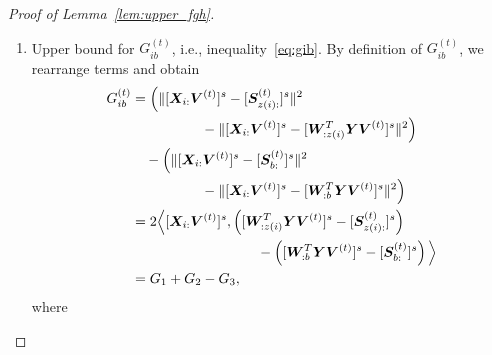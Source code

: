 \documentclass[journal]{IEEEtran}
\theoremstyle{definition}
\theoremstyle{definition}
\newcommand{\of}[1]{\left(#1\right)}
\begin{document}
\begin{proof}[Proof of Lemma~\ref{lem:upper_fgh}]
\begin{enumerate}[wide]
    \vspace{-0.5cm}
    \small
    \begin{align}
        &\onormSize{}{  [  \tilde \mS_{z(i):} ]^s - [  \tilde \mS_{b:} ]^s  }^2 \\
        &=  \onormSize{}{  [  \tilde \mS_{z(i):} ]^s -[ \mS_{z(i):} ]^s +  [ \mS_{z(i):} ]^s - [ \mS_{b:} ]^s + [ \mS_{b:} ]^s -[  \tilde \mS_{b:} ]^s  }^2 \\
        & \lesssim \onormSize{}{ [ \mS_{z(i):} ]^s - [ \mS_{b:} ]^s }^2 + \max_{a \in [r]} \onormSize{}{ [ \mS_{a:} ]^s -[  \tilde \mS_{a:} ]^s }^2 \\
        & \lesssim \onormSize{}{ [ \mS_{z(i):} ]^s - [ \mS_{b:} ]^s }^2  + \max_{a \in [r]} \frac{1}{\onormSize{}{\mS_{a:} }^2} \onormSize{}{ \mW_{:a}^T \mE \mV}^2\\
        & \lesssim \onormSize{}{ [ \mS_{z(i):} ]^s - [ \mS_{b:} ]^s }^2, \label{eq:fib_2}
    \end{align}
    \normalsize
    where the second inequality follows from Lemma~\ref{lem:norm_diff}, and the last inequality follows from the assumptions on $\onormSize{}{\mS_{a:}}$ in the parameter space~\eqref{eq:family}, the inequality~\eqref{eq:cond1} in Condition~\ref{cond:origin} and the assumption $\Delta_{\min}^2 \gtrsim p^{-K/2}\log p$. 
    
    Therefore, we finish the proof of inequality~\eqref{eq:fib} by plugging the inequalities~\eqref{eq:fib_1} and \eqref{eq:fib_2} into the upper bound~\eqref{eq:fib_decomp}.
    
    \item Upper bound for $G_{ib}^{(t)}$, i.e., inequality~\eqref{eq:gib}. By definition of $G_{ib}^{(t)}$, we rearrange terms and obtain
    \begin{align}
        G_{ib}^{(t)} &=   \Big( \onormSize{}{ [\mX_{i:} \mV^{(t)}]^s -  [  \mS_{z(i):}^{(t)}  ]^s}^2 \\
        &\quad \quad \quad \quad \quad-  \onormSize{}{ [\mX_{i:} \mV^{(t)}]^s -  [  \mW_{:z(i)}^T \mY \mV^{(t)} ]^s}^2\Big)   \\
        & \quad -   \Big( \onormSize{}{ [\mX_{i:} \mV^{(t)}]^s -  [  \mS_{b:}^{(t)}  ]^s}^2 \\
        & \quad \quad \quad \quad \quad -  \onormSize{}{ [\mX_{i:} \mV^{(t)}]^s -  [  \mW_{:b}^T \mY \mV^{(t)} ]^s}^2 \Big) \\
        &= 2 \Big\langle  [\mX_{i:} \mV^{(t)}]^s , \of{[  \mW_{:z(i)}^T \mY \mV^{(t)} ]^s -  [  \mS_{z(i):}^{(t)}  ]^s } \\
        &\quad \quad \quad \quad \quad  \quad \quad \quad \quad  - \of{ [  \mW_{:b}^T \mY \mV^{(t)} ]^s -  [  \mS_{b:}^{(t)}  ]^s } \Big\rangle \\
      &= G_1 + G_2 - G_3, \label{eq:gib_decomp}
    \end{align}
    where 
    

\end{enumerate}
\end{proof}
\end{document}
